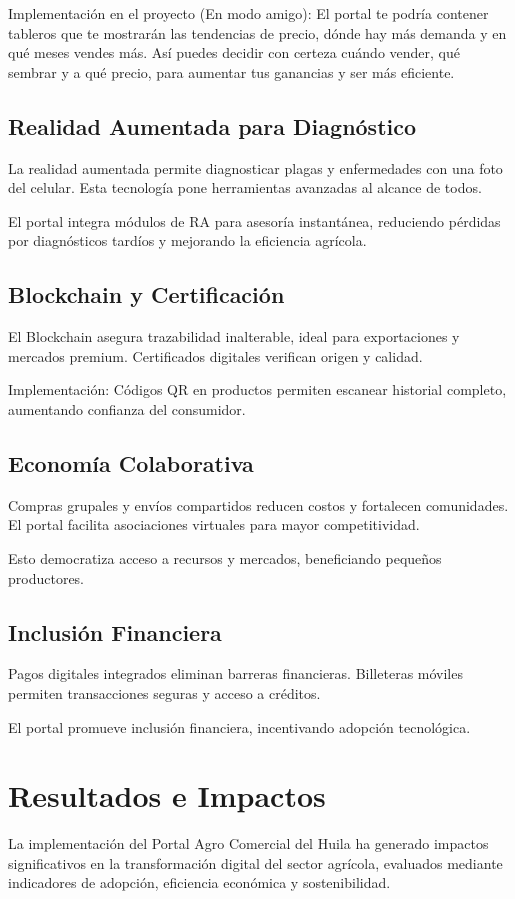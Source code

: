 Implementación en el proyecto (En modo amigo): El portal te podría contener tableros que te mostrarán las tendencias de precio, dónde hay más demanda y en qué meses vendes más. Así puedes decidir con certeza cuándo vender, qué sembrar y a qué precio, para aumentar tus ganancias y ser más eficiente.

\subsection{Realidad Aumentada para Diagnóstico}
La realidad aumentada permite diagnosticar plagas y enfermedades con una foto del celular. Esta tecnología pone herramientas avanzadas al alcance de todos.

El portal integra módulos de RA para asesoría instantánea, reduciendo pérdidas por diagnósticos tardíos y mejorando la eficiencia agrícola.

\subsection{Blockchain y Certificación}
El Blockchain asegura trazabilidad inalterable, ideal para exportaciones y mercados premium. Certificados digitales verifican origen y calidad.

Implementación: Códigos QR en productos permiten escanear historial completo, aumentando confianza del consumidor.

\subsection{Economía Colaborativa}
Compras grupales y envíos compartidos reducen costos y fortalecen comunidades. El portal facilita asociaciones virtuales para mayor competitividad.

Esto democratiza acceso a recursos y mercados, beneficiando pequeños productores.

\subsection{Inclusión Financiera}
Pagos digitales integrados eliminan barreras financieras. Billeteras móviles permiten transacciones seguras y acceso a créditos.

El portal promueve inclusión financiera, incentivando adopción tecnológica.

\section{Resultados e Impactos}
La implementación del Portal Agro Comercial del Huila ha generado impactos significativos en la transformación digital del sector agrícola, evaluados mediante indicadores de adopción, eficiencia económica y sostenibilidad.

